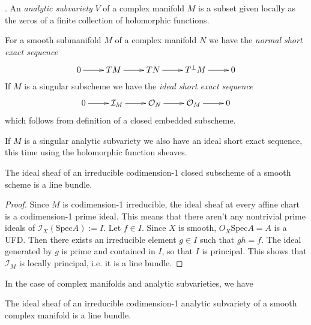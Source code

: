 \begin{definition}
\label{definition-analytic-subvariety}
\cite{gri}. An {\it analytic subvariety} $V$ of a complex manifold $M$ is a
subset given locally as the zeros of a finite collection of holomorphic
functions.
\end{definition}

For a smooth submanifold $M$ of a complex manifold $N$ we have the {\it normal 
short exact sequence}
$$
\xymatrix{
0\ar[r]&TM\ar[r]&TN\ar[r]&T^\perp M\ar[r]&0
}
$$
If $M$ is a singular subscheme we have the {\it ideal short exact sequence}
$$
\xymatrix{
0\ar[r]&\mathcal{I}_M\ar[r]&\mathcal{O}_N\ar[r]&\mathcal{O}_M\ar[r]&0
}
$$
which follows from definition of a closed embedded subscheme.

If $M$ is a singular analytic subvariety we also have an ideal short exact
sequence, this time using the holomorphic function sheaves.

\begin{lemma}
\label{lemma-ideal-sheaf-is-line-bundle-schemes}
The ideal sheaf of an irreducible codimension-1 closed subscheme of a smooth
scheme is a line bundle.
\end{lemma}

\begin{proof}
Since $M$ is codimension-1 irreducible, the ideal sheaf at every affine chart is
a codimension-1 prime ideal. This means that there aren't any nontrivial prime
ideals of $\mathcal{I}_X(\text{Spec}A):=I$. Let $f\in I$.
Since $X$ is smooth, $O_X\text{Spec}A=A$ is a UFD. Then there exists an
irreducible element $g\in I$ such that $gh=f$. The ideal generated by $g$ is
prime and contained in $I$, so that $I$ is principal. This shows that
$\mathcal{I}_M$ is locally principal, i.e. it is a line bundle.
\end{proof}

In the case of complex manifolds and analytic subvarieties, we have

\begin{lemma}
\label{lemma-ideal-sheaf-is-line-bundle-analytic-varieties}
The ideal sheaf of an irreducible codimension-1 analytic subvariety of a smooth
complex manifold is a line bundle.
\end{lemma}

